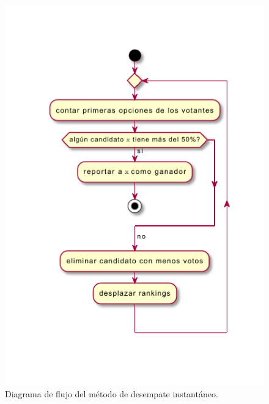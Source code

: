 \begin{figure}[!h]
    \centering
    \includegraphics[scale=1.4]{Graphics/irv.pdf}
    \caption{Diagrama de flujo del m\'etodo de desempate instant\'aneo.}
    \label{fig:irv}
\end{figure}